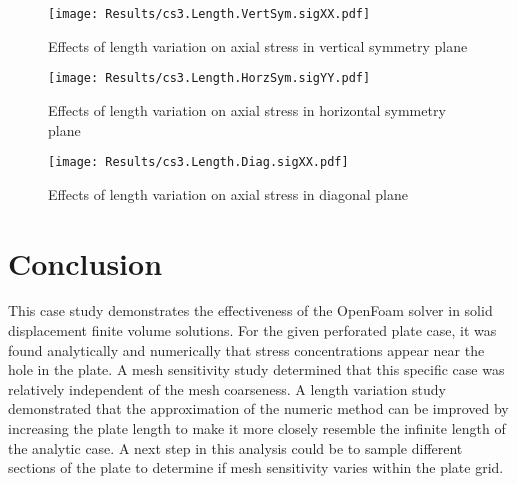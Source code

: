 \documentclass[twocolumn,10pt]{asme2ej}
\begin{document}
\begin{figure}[htb]
\begin{center}
\texttt{[image: Results/cs3.Length.VertSym.sigXX.pdf]}
\caption{Effects of length variation on axial stress in vertical symmetry plane}
\texttt{[image: Results/cs3.Length.HorzSym.sigYY.pdf]}
\caption{Effects of length variation on axial stress in horizontal symmetry plane}
\texttt{[image: Results/cs3.Length.Diag.sigXX.pdf]}
\caption{Effects of length variation on axial stress in diagonal plane}
\end{center}
\end{figure}




\clearpage
\section{Conclusion}
This case study demonstrates the effectiveness of the OpenFoam solver in solid displacement finite volume solutions.  For the given perforated plate case, it was found analytically and numerically that stress concentrations appear near the hole in the plate.  A mesh sensitivity study determined that this specific case was relatively independent of the mesh coarseness.  A length variation study demonstrated that the approximation of the numeric method can be improved by increasing the plate length to make it more closely resemble the infinite length of the analytic case.  A next step in this analysis could be to sample different sections of the plate to determine if mesh sensitivity varies within the plate grid.
\end{document}
